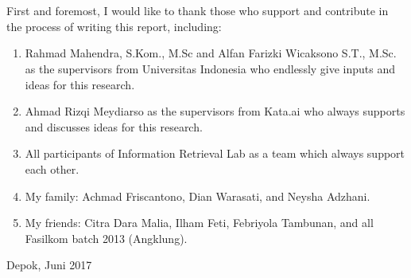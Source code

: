 \chapter*{\kataPengantar}
First and foremost, I would like to thank those who support and contribute in the process of writing this report, including:
%
%
\begin{enumerate}
	\item Rahmad Mahendra, S.Kom., M.Sc and Alfan Farizki Wicaksono S.T., M.Sc. as the supervisors from Universitas Indonesia who endlessly give inputs and ideas for this research.
	\item Ahmad Rizqi Meydiarso as the supervisors from Kata.ai who always supports and discusses ideas for this research.
	\item All participants of Information Retrieval Lab as a team which always support each other.
	\item My family: Achmad Friscantono, Dian Warasati, and Neysha Adzhani.
	\item My friends: Citra Dara Malia, Ilham Feti, Febriyola Tambunan, and all Fasilkom batch 2013 (Angklung).
\end{enumerate}
\vspace*{0.1cm}
\begin{flushright}
Depok, Juni 2017\\[0.1cm]
\vspace*{1cm}
\penulis

\end{flushright}